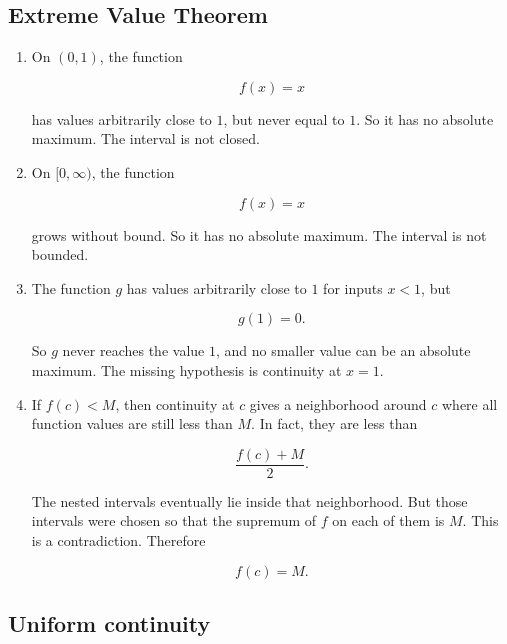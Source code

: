 \subsection*{Extreme Value Theorem}

\begin{enumerate}
\item
On \((0,1)\), the function

\[
f(x)=x
\]

has values arbitrarily close to \(1\), but never equal to \(1\).  So it has no absolute
maximum.  The interval is not closed.

\item
On \([0,\infty)\), the function

\[
f(x)=x
\]

grows without bound.  So it has no absolute maximum.  The interval is not bounded.

\item
The function \(g\) has values arbitrarily close to \(1\) for inputs \(x<1\), but

\[
g(1)=0.
\]

So \(g\) never reaches the value \(1\), and no smaller value can be an absolute maximum.
The missing hypothesis is continuity at \(x=1\).

\item
If \(f(c)<M\), then continuity at \(c\) gives a neighborhood around \(c\) where all
function values are still less than \(M\).  In fact, they are less than

\[
\frac{f(c)+M}{2}.
\]

The nested intervals eventually lie inside that neighborhood.  But those intervals were
chosen so that the supremum of \(f\) on each of them is \(M\).  This is a contradiction.
Therefore

\[
f(c)=M.
\]
\end{enumerate}

\subsection*{Uniform continuity}


